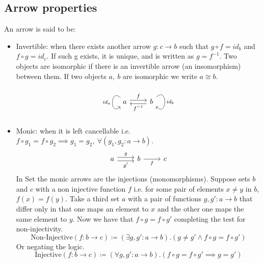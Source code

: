\subsection{Arrow properties}
An arrow is said to be: \parencite{maclane:working_mathematician}
\begin{itemize}
  \item Invertible: when there exists another arrow $g:c \to b$ such that
    $g\circ f = id_b$ and $f\circ g = id_c$. If such g exists, it is unique, and
    is written as $g= f^{-1}$. Two objects are isomorphic if there is an
    invertible arrow (an insomorphism) between them. If two objects $a,\ b$
    are isomorphic we write $a\cong b$.
    \[\begin{tikzcd}
      a & b
      \arrow["f", shift left=1, from=1-1, to=1-2]
      \arrow["{f^{-1}}", shift left=1, from=1-2, to=1-1]
      \arrow["id_a"', out=90+45, in=-90-45, looseness=4.5, from=1-1, to=1-1]
      \arrow["id_b", out=45, in=-45, looseness=4.5, from=1-2, to=1-2]
    \end{tikzcd}\]
  \item Monic: when it is left cancellable i.e.
    $f \circ g_1 = f \circ g_2 \implies g_1 = g_2,\ \forall (g_1, g_2:a\to b)$.
    \[\begin{tikzcd}
      a & b & c
      \arrow["g", shift left=1, from=1-1, to=1-2]
      \arrow["{g'}"', shift right=1, from=1-1, to=1-2]
      \arrow["f"', from=1-2, to=1-3]
    \end{tikzcd}\]
    In Set the monic arrows are the injections (monomorphisms).
    Suppose sets $b$ and $c$ with a non injective function $f$ i.e. for some
    pair of elements $x \neq y$ in $b$, $f(x) = f(y)$. Take a third set $a$ with
    a pair of functions $g, g':a\to b$ that differ only in that one maps an
    element to $x$ and the other one maps the same element to $y$. Now we have
    that $f\circ g = f\circ g'$ completing the test for non-injectivity.
    \[\text{Non-Injective}(f:b\to c)
      \coloneq(\exists g, g':a\to b).(g \neq g' \land f\circ g = f\circ g')\]
    Or negating the logic.
    \[\text{Injective}(f:b\to c)
      \coloneq(\forall g, g':a\to b).(f\circ g = f\circ g' \implies g=g')\]


\end{itemize}

